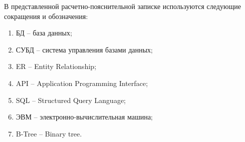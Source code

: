 
В представленной расчетно-пояснительной записке используются следующие сокращения и обозначения:
\begin{enumerate}
    \item БД -- база данных;
    \item СУБД -- система управления базами данных;
    \item ER -- Entity Relationship;
    \item API -- Application Programming Interface;
    \item SQL -- Structured Query Language;
    \item ЭВМ -- электронно-вычислительная машина;
    \item B-Tree -- Binary tree.
\end{enumerate}
